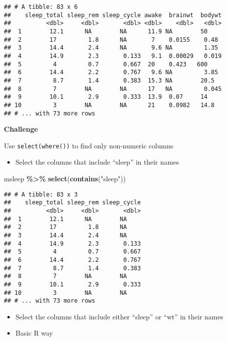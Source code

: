 \documentclass[
]{book}
\newenvironment{Shaded}{\begin{snugshade}}{\end{snugshade}}
\newcommand{\KeywordTok}[1]{\textcolor[rgb]{0.13,0.29,0.53}{\textbf{#1}}}
\newcommand{\NormalTok}[1]{#1}
\newcommand{\OperatorTok}[1]{\textcolor[rgb]{0.81,0.36,0.00}{\textbf{#1}}}
\newcommand{\StringTok}[1]{\textcolor[rgb]{0.31,0.60,0.02}{#1}}
\providecommand{\tightlist}{%
  \setlength{\itemsep}{0pt}\setlength{\parskip}{0pt}}
\begin{document}
\begin{verbatim}
## # A tibble: 83 x 6
##    sleep_total sleep_rem sleep_cycle awake  brainwt  bodywt
##          <dbl>     <dbl>       <dbl> <dbl>    <dbl>   <dbl>
##  1        12.1      NA        NA      11.9 NA        50    
##  2        17         1.8      NA       7    0.0155    0.48 
##  3        14.4       2.4      NA       9.6 NA         1.35 
##  4        14.9       2.3       0.133   9.1  0.00029   0.019
##  5         4         0.7       0.667  20    0.423   600    
##  6        14.4       2.2       0.767   9.6 NA         3.85 
##  7         8.7       1.4       0.383  15.3 NA        20.5  
##  8         7        NA        NA      17   NA         0.045
##  9        10.1       2.9       0.333  13.9  0.07     14    
## 10         3        NA        NA      21    0.0982   14.8  
## # ... with 73 more rows
\end{verbatim}

\textbf{Challenge}

Use \texttt{select(where())} to find only non-numeric columns

\begin{itemize}
\tightlist
\item
  Select the columns that include ``sleep'' in their names
\end{itemize}

\begin{Shaded}
\begin{Highlighting}[]
\NormalTok{msleep }\OperatorTok{\%\textgreater{}\%}
\StringTok{  }\KeywordTok{select}\NormalTok{(}\KeywordTok{contains}\NormalTok{(}\StringTok{"sleep"}\NormalTok{))}
\end{Highlighting}
\end{Shaded}

\begin{verbatim}
## # A tibble: 83 x 3
##    sleep_total sleep_rem sleep_cycle
##          <dbl>     <dbl>       <dbl>
##  1        12.1      NA        NA    
##  2        17         1.8      NA    
##  3        14.4       2.4      NA    
##  4        14.9       2.3       0.133
##  5         4         0.7       0.667
##  6        14.4       2.2       0.767
##  7         8.7       1.4       0.383
##  8         7        NA        NA    
##  9        10.1       2.9       0.333
## 10         3        NA        NA    
## # ... with 73 more rows
\end{verbatim}

\begin{itemize}
\item
  Select the columns that include either ``sleep'' or ``wt'' in their names
\item
  Basic R way
\end{itemize}
\end{document}
